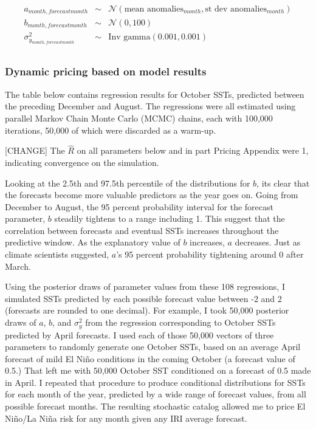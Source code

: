 \documentclass[authoryear]{article}
\begin{document}
\begin{equation}
\begin{array}{lcl}
a_{month,forecast month}  & \sim & \mathcal{N}(\mbox{mean anomalies}_{month}, \mbox{st dev anomalies}_{month}) \\
b_{month,forecast month}  & \sim & \mathcal{N}(0, 100) \\
\sigma_{y_{month,forecast month}}^2 & \sim  &\mbox{Inv gamma}(0.001, 0.001) \\
\end{array}
\label{eqn:priorsconditionalEstEqn}
\end{equation}

\subsubsection{Dynamic pricing based on model results}
The table below contains regression results for October SSTs, predicted between the preceding December and August. The regressions were all estimated using parallel Markov Chain Monte Carlo (MCMC) chains, each with 100,000 iterations, 50,000 of which were discarded as a warm-up\cite{stan2013}. 

[CHANGE]
The $\hat{R}$ on all parameters below and in part Pricing Appendix were 1, indicating convergence on the simulation.



Looking at the 2.5th and 97.5th percentile of the distributions for $b$, its clear that the forecasts become more valuable predictors as the year goes on. Going from December to August, the 95 percent probability interval for the forecast parameter, $b$ steadily tightens to a range including 1. This suggest that the correlation between forecasts and eventual SSTs increases throughout the predictive window. As the explanatory value of $b$ increases, $a$ decreases. Just as climate scientists suggested, $a$'s 95 percent probability tightening around 0 after March.

Using the posterior draws of parameter values from these 108 regressions, I simulated SSTs predicted by each possible forecast value between -2 and 2 (forecasts are rounded to one decimal). For example, I took 50,000 posterior draws of $a$, $b$, and $\sigma_{y}^2$ from the regression corresponding to October SSTs predicted by April forecasts. I used each of those 50,000 vectors of three parameters to randomly generate one October SSTs, based on an average April forecast of mild El Ni\~no conditions in the coming October (a forecast value of 0.5.) That left me with 50,000 October SST conditioned on a forecast of 0.5 made in April. I repeated that procedure to produce conditional distributions for SSTs for each month of the year, predicted by a wide range of forecast values, from all possible forecast months. The resulting stochastic catalog allowed me to price El Ni\~no/La Ni\~na risk for any month given any IRI average forecast. 
\end{document}
